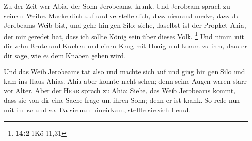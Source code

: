 Zu der Zeit war Abia, der Sohn Jerobeams, krank.
 Und Jerobeam sprach zu seinem Weibe: Mache dich auf und
verstelle dich, dass niemand merke, dass du Jerobeams Weib bist, und
gehe hin gen Silo; siehe, daselbst ist der Prophet Ahia, der mir geredet
hat, dass ich sollte König sein über dieses Volk. \footnote{\textbf{14:2}
  1Kö 11,31}  Und nimm mit dir zehn Brote und Kuchen und
einen Krug mit Honig und komm zu ihm, dass er dir sage, wie es dem
Knaben gehen wird.

 Und das Weib Jerobeams tat also und machte sich auf und
ging hin gen Silo und kam ins Haus Ahias. Ahia aber konnte nicht sehen;
denn seine Augen waren starr vor Alter.  Aber der
\textsc{Herr} sprach zu Ahia: Siehe, das Weib Jerobeams kommt, dass sie
von dir eine Sache frage um ihren Sohn; denn er ist krank. So rede nun
mit ihr so und so. Da sie nun hineinkam, stellte sie sich fremd.


